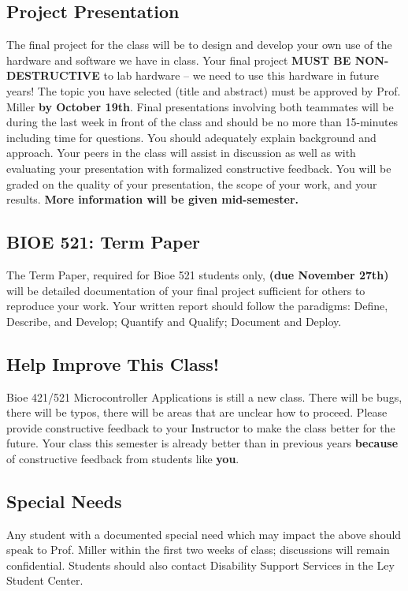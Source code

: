 \documentclass[10pt]{article}
\def\projectOutlineDue{October 19th} %
\def\termPaperDue{November 27th} %
\begin{document}
\subsection*{Project Presentation}
The final project for the class will be to design and develop your own use of the hardware and software we have in class. Your final project \textbf{MUST BE NON-DESTRUCTIVE} to lab hardware -- we need to use this hardware in future years! The topic you have selected (title and abstract) must be approved by Prof. Miller \textbf{by \projectOutlineDue}. Final presentations involving both teammates will be during the last week in front of the class and should be no more than 15-minutes including time for questions. You should adequately explain background and approach. Your peers in the class will assist in discussion as well as with evaluating your presentation with formalized constructive feedback. You will be graded on the quality of your presentation, the scope of your work, and your results. \textbf{More information will be given mid-semester.} 

\subsection*{BIOE 521: Term Paper}
The Term Paper, required for Bioe 521 students only, \textbf{(due \termPaperDue)} will be detailed documentation of your final project sufficient for others to reproduce your work. Your written report should follow the paradigms: Define, Describe, and Develop; Quantify and Qualify; Document and Deploy.


\subsection*{Help Improve This Class!}
Bioe 421/521 Microcontroller Applications is still a new class. There will be bugs, there will be typos, there will be areas that are unclear how to proceed. Please provide constructive feedback to your Instructor to make the class better for the future. Your class this semester is already better than in previous years \textbf{because} of constructive feedback from students like \textbf{you}.


\subsection*{Special Needs}
Any student with a documented special need which may impact the above should speak to Prof. Miller within the first two weeks of class; discussions will remain confidential. Students should also contact Disability Support Services in the Ley Student Center.
\end{document}
